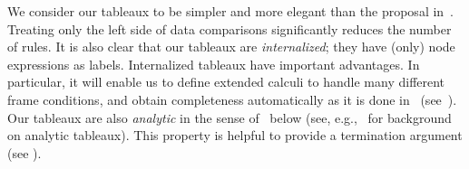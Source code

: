 

We consider our tableaux to be simpler and more elegant than the proposal  in~\cite{ArecesFS17}. Treating only the left side of data comparisons significantly reduces  the number of rules. It is also clear that our tableaux are \emph{internalized}; they have (only) node expressions as labels. Internalized tableaux have important advantages. In particular, it will enable us to define extended calculi to handle many different frame conditions, and obtain completeness automatically as it is done in~\cite{Blackburn00,Blackburn2002BeyondPA} (see~). 
Our tableaux are also \emph{analytic} in the sense of~ below (see, e.g.,~\cite{Smullyan1968} for background on analytic tableaux). %
This property is helpful to provide a termination argument (see ).


